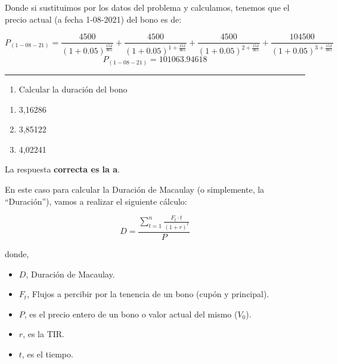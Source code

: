 \documentclass[
  letterpaper,
  DIV=11,
  numbers=noendperiod]{scrreprt}
\providecommand{\tightlist}{%
  \setlength{\itemsep}{0pt}\setlength{\parskip}{0pt}}\usepackage{longtable,booktabs,array}
\begin{document}
\begin{tcolorbox}
\begin{tcolorbox}
Donde si sustituimos por los datos del problema y calculamos, tenemos
que el precio actual (a fecha 1-08-2021) del bono es de:

\[P_{(1-08-21)}=\frac{4500}{\left(1+0.05\right)^{\frac{152}{365}}}+\frac{4500}{\left(1+0.05\right)^{1+\frac{152}{365}}}+\frac{4500}{\left(1+0.05\right)^{2+\frac{152}{365}}}+\frac{104500}{\left(1+0.05\right)^{3+\frac{152}{365}}}\]
\[P_{(1-08-21)}=101063.94618\]

\end{tcolorbox}

\begin{center}\rule{0.5\linewidth}{0.5pt}\end{center}

\begin{enumerate}
\def\labelenumi{\arabic{enumi}.}
\setcounter{enumi}{1}
\tightlist
\item
  Calcular la duración del bono
\end{enumerate}

\begin{enumerate}
\def\labelenumi{\alph{enumi}.}
\item
  3,16286
\item
  3,85122
\item
  4,02241
\end{enumerate}

\begin{tcolorbox}[enhanced jigsaw, toprule=.15mm, left=2mm, breakable, opacitybacktitle=0.6, toptitle=1mm, coltitle=black, arc=.35mm, leftrule=.75mm, bottomtitle=1mm, titlerule=0mm, title=\textcolor{quarto-callout-tip-color}{\faLightbulb}\hspace{0.5em}{Solución}, rightrule=.15mm, opacityback=0, bottomrule=.15mm, colback=white, colframe=quarto-callout-tip-color-frame, colbacktitle=quarto-callout-tip-color!10!white]

La respuesta \textbf{correcta es la a}.

En este caso para calcular la Duración de Macaulay (o simplemente, la
``Duración''), vamos a realizar el siguiente cálculo:

\[D=\frac{\sum_{t=1}^{n}\frac{F_t\cdot t}{\left(1+r\right)^t}}{P}\]

donde,

\begin{itemize}
\item
  \(D\), Duración de Macaulay.
\item
  \(F_t\), Flujos a percibir por la tenencia de un bono (cupón y
  principal).
\item
  \(P\), es el precio entero de un bono o valor actual del mismo
  (\(V_0\)).
\item
  \(r\), es la TIR.
\item
  \(t\), es el tiempo.
\end{itemize}


\end{tcolorbox}
\end{tcolorbox}
\end{document}
